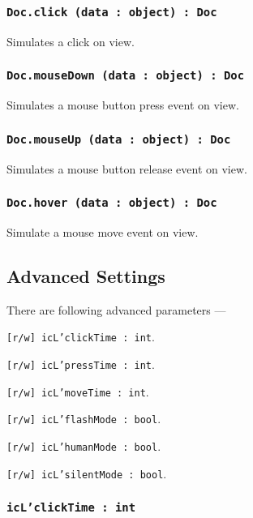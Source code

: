 \subsubsection{\texttt{Doc.click (data : object) : Doc}}

Simulates a click on view.

\subsubsection{\texttt{Doc.mouseDown (data : object) : Doc}}

Simulates a mouse button press event on view.

\subsubsection{\texttt{Doc.mouseUp (data : object) : Doc}}

Simulates a mouse button release event on view.

\subsubsection{\texttt{Doc.hover (data : object) : Doc}}

Simulate a mouse move event on view.

\subsection{Advanced Settings}

There are following advanced parameters —
\begin{icItems}
	\item \texttt{[r/w] icL'clickTime : int}.
	\item \texttt{[r/w] icL'pressTime : int}.
	\item \texttt{[r/w] icL'moveTime : int}.
	\item \texttt{[r/w] icL'flashMode : bool}.
	\item \texttt{[r/w] icL'humanMode : bool}.
	\item \texttt{[r/w] icL'silentMode : bool}.
\end{icItems}

\subsubsection{\texttt{icL'clickTime : int}}

